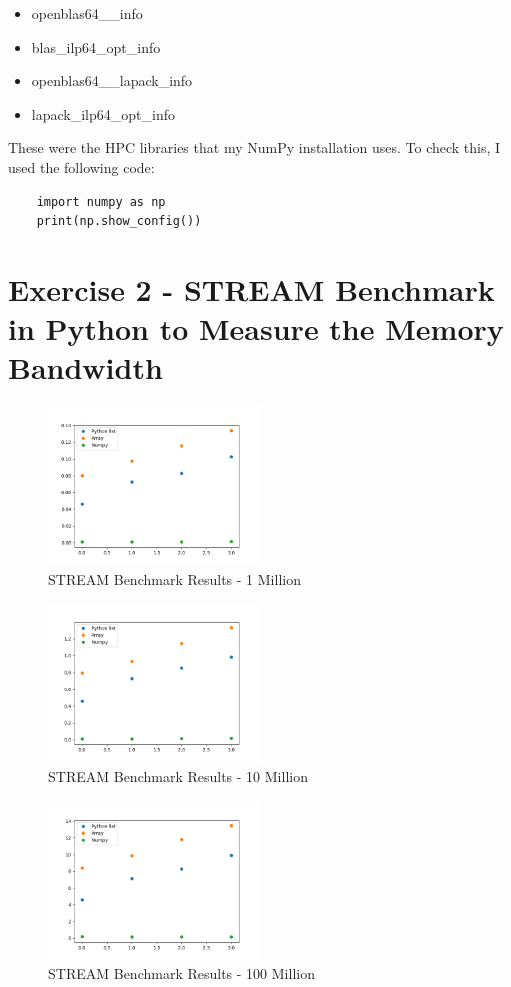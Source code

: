 \documentclass{article}
\begin{document}
\begin{itemize}
\item openblas64__info
\item blas_ilp64_opt_info
\item openblas64__lapack_info
\item lapack_ilp64_opt_info
\end{itemize}
These were the HPC libraries that my NumPy installation uses. 
To check this, I used the following code:
\begin{lstlisting}
    import numpy as np
    print(np.show_config())
\end{lstlisting}


\section{Exercise 2 - STREAM Benchmark in Python to Measure the Memory Bandwidth}

\begin{figure}[h]
\centering
\includegraphics[width=0.5\textwidth]{1000000.png}
\caption{STREAM Benchmark Results - 1 Million}
\end{figure}

\begin{figure}[h]
\centering
\includegraphics[width=0.5\textwidth]{10000000.png}
\caption{STREAM Benchmark Results - 10 Million}
\end{figure}

\begin{figure}[h]
\centering
\includegraphics[width=0.5\textwidth]{100000000.png}
\caption{STREAM Benchmark Results - 100 Million}
\end{figure}
\end{document}
